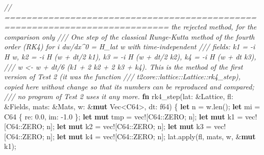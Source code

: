 \documentclass[
  10pt,
]{article}
\newenvironment{Shaded}{}{}
\newcommand{\CommentTok}[1]{\textcolor[rgb]{0.38,0.63,0.69}{\textit{#1}}}
\newcommand{\DataTypeTok}[1]{\textcolor[rgb]{0.56,0.13,0.00}{#1}}
\newcommand{\DecValTok}[1]{\textcolor[rgb]{0.25,0.63,0.44}{#1}}
\newcommand{\KeywordTok}[1]{\textcolor[rgb]{0.00,0.44,0.13}{\textbf{#1}}}
\newcommand{\NormalTok}[1]{#1}
\newcommand{\OperatorTok}[1]{\textcolor[rgb]{0.40,0.40,0.40}{#1}}
\newcommand{\PreprocessorTok}[1]{\textcolor[rgb]{0.74,0.48,0.00}{#1}}
\begin{document}
\begin{Shaded}
\begin{Highlighting}[]
\CommentTok{// ============================================================================ the rejected method, for the comparison only}
\CommentTok{/// One step of the classical Runge{-}Kutta method of the fourth order (RK4) for i dw/dx\^{}0 = H\_lat w with time{-}independent}
\CommentTok{/// fields: k1 = {-}i H w, k2 = {-}i H (w + dt/2 k1), k3 = {-}i H (w + dt/2 k2), k4 = {-}i H (w + dt k3),}
\CommentTok{/// w \textless{}{-} w + dt/6 (k1 + 2 k2 + 2 k3 + k4).  This is the method of the first version of Test 2 (it was the function}
\CommentTok{/// t2core::lattice::Lattice::rk4\_step), copied here without change so that its numbers can be reproduced and compared;}
\CommentTok{/// no program of Test 2 uses it any more.}
\KeywordTok{fn}\NormalTok{ rk4\_step(lat}\OperatorTok{:} \OperatorTok{\&}\NormalTok{Lattice}\OperatorTok{,}\NormalTok{ fl}\OperatorTok{:} \OperatorTok{\&}\NormalTok{Fields}\OperatorTok{,}\NormalTok{ mats}\OperatorTok{:} \OperatorTok{\&}\NormalTok{Mats}\OperatorTok{,}\NormalTok{ w}\OperatorTok{:} \OperatorTok{\&}\KeywordTok{mut} \DataTypeTok{Vec}\OperatorTok{\textless{}}\NormalTok{C64}\OperatorTok{\textgreater{},}\NormalTok{ dt}\OperatorTok{:} \DataTypeTok{f64}\NormalTok{) }\OperatorTok{\{}
    \KeywordTok{let}\NormalTok{ n }\OperatorTok{=}\NormalTok{ w}\OperatorTok{.}\NormalTok{len()}\OperatorTok{;}
    \KeywordTok{let}\NormalTok{ mi }\OperatorTok{=}\NormalTok{ C64 }\OperatorTok{\{}\NormalTok{ re}\OperatorTok{:} \DecValTok{0.0}\OperatorTok{,}\NormalTok{ im}\OperatorTok{:} \OperatorTok{{-}}\DecValTok{1.0} \OperatorTok{\};}
    \KeywordTok{let} \KeywordTok{mut}\NormalTok{ tmp }\OperatorTok{=} \PreprocessorTok{vec!}\NormalTok{[}\PreprocessorTok{C64::}\NormalTok{ZERO}\OperatorTok{;}\NormalTok{ n]}\OperatorTok{;}
    \KeywordTok{let} \KeywordTok{mut}\NormalTok{ k1 }\OperatorTok{=} \PreprocessorTok{vec!}\NormalTok{[}\PreprocessorTok{C64::}\NormalTok{ZERO}\OperatorTok{;}\NormalTok{ n]}\OperatorTok{;}
    \KeywordTok{let} \KeywordTok{mut}\NormalTok{ k2 }\OperatorTok{=} \PreprocessorTok{vec!}\NormalTok{[}\PreprocessorTok{C64::}\NormalTok{ZERO}\OperatorTok{;}\NormalTok{ n]}\OperatorTok{;}
    \KeywordTok{let} \KeywordTok{mut}\NormalTok{ k3 }\OperatorTok{=} \PreprocessorTok{vec!}\NormalTok{[}\PreprocessorTok{C64::}\NormalTok{ZERO}\OperatorTok{;}\NormalTok{ n]}\OperatorTok{;}
    \KeywordTok{let} \KeywordTok{mut}\NormalTok{ k4 }\OperatorTok{=} \PreprocessorTok{vec!}\NormalTok{[}\PreprocessorTok{C64::}\NormalTok{ZERO}\OperatorTok{;}\NormalTok{ n]}\OperatorTok{;}
\NormalTok{    lat}\OperatorTok{.}\NormalTok{apply(fl}\OperatorTok{,}\NormalTok{ mats}\OperatorTok{,}\NormalTok{ w}\OperatorTok{,} \OperatorTok{\&}\KeywordTok{mut}\NormalTok{ k1)}\OperatorTok{;}

\end{Highlighting}
\end{Shaded}
\end{document}

